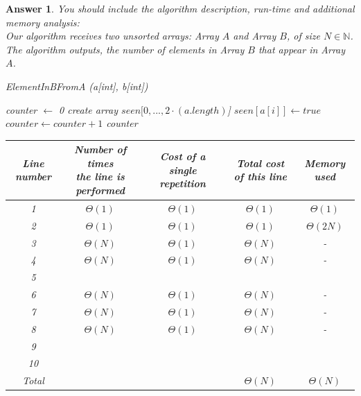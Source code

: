 \documentclass[a4paper]{article}
\theoremstyle{remarksStyle}
\theoremstyle{questionStyle}
\theoremstyle{answerStyle}
\newtheorem{answer}{Answer}
\begin{document}
\begin{answer}
    You should include the algorithm description, run-time and additional memory analysis: \\
    Our algorithm receives two unsorted arrays: Array $A$ and Array $B$, of size $N\in \mathbb {N}$.
    The algorithm outputs, the number of elements in Array $B$ that appear in Array $A$.
    \bigskip

\begin{algorithm}[H]
  \caption{ElementInBFromA (a[int], b[int])}
  \begin{algorithmic}[1]
    \STATE counter $\gets$ 0
    \STATE  create array $seen[0,...,2 \cdot (a.length)$]
          \STATE $seen[a[i]] \gets true$
      \ENDFOR  
          \STATE $counter \gets counter + 1$
          \ENDIF
      \ENDFOR  
    \RETURN counter
  \end{algorithmic} 
\end{algorithm}

\begin{center}    
\begin{tabular}{||c | c | c | c | c ||} 
 \hline
 Line number & \makecell{Number of times \\ the line is performed} & Cost of a single repetition & Total cost of this line & Memory used\\ [0.5ex] 
 \hline\hline
 1 & $\Theta(1)$ & $\Theta(1)$ & $\Theta (1)$ & $\Theta (1)$  \\ 
 \hline
 2 & $\Theta(1)$& $\Theta(1)$& $\Theta(1)$ & $\Theta(2N)$ \\
 \hline
 3 & $\Theta(N)$ &$\Theta(1)$ & $\Theta(N)$ & -\\ 
  \hline
 4 &$\Theta(N)$ &$\Theta(1)$ &$\Theta(N)$ & - \\ 
   \hline
 5 & \cellcolor{Gray} & \cellcolor{Gray} & \cellcolor{Gray} & \cellcolor{Gray}\\  
  \hline
 6 &$\Theta(N)$ &$\Theta(1)$ &$\Theta(N)$ & - \\ 
    \hline
 7 &$\Theta(N)$ &$\Theta(1)$ &$\Theta(N)$ & - \\ 
 \hline
 8 &$\Theta(N)$ &$\Theta(1)$ &$\Theta(N)$ & - \\ 
 \hline
 9 & \cellcolor{Gray} & \cellcolor{Gray} & \cellcolor{Gray} & \cellcolor{Gray}\\  
10 & \cellcolor{Gray} & \cellcolor{Gray} & \cellcolor{Gray} & \cellcolor{Gray}\\  
 Total & \cellcolor{Gray} & \cellcolor{Gray} & $\Theta (N)$ &$\Theta(N)$  \\ 
 \hline
\end{tabular}
\end{center}
\end{answer}
\end{document}
